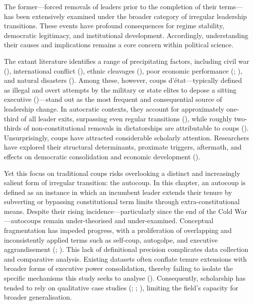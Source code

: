 \documentclass[
  12pt,
]{report}
\begin{document}
The former---forced removals of leaders prior to the completion of their
terms---has been extensively examined under the broader category of
irregular leadership transitions. These events have profound
consequences for regime stability, democratic legitimacy, and
institutional development. Accordingly, understanding their causes and
implications remains a core concern within political science.

The extant literature identifies a range of precipitating factors,
including civil war (), international conflict (), ethnic cleavages
(), poor
economic performance (;
), and natural
disasters (). Among these, however, coups d'état---typically defined as
illegal and overt attempts by the military or state elites to depose a
sitting executive ()---stand out as the most frequent and consequential source of
leadership change. In autocratic contexts, they account for
approximately one-third of all leader exits, surpassing even regular
transitions (), while
roughly two-thirds of non-constitutional removals in dictatorships are
attributable to coups ().
Unsurprisingly, coups have attracted considerable scholarly attention.
Researchers have explored their structural determinants, proximate
triggers, aftermath, and effects on democratic consolidation and
economic development ().

Yet this focus on traditional coups risks overlooking a distinct and
increasingly salient form of irregular transition: the autocoup. In this
chapter, an autocoup is defined as an instance in which an incumbent
leader extends their tenure by subverting or bypassing constitutional
term limits through extra-constitutional means. Despite their rising
incidence---particularly since the end of the Cold War---autocoups
remain under-theorised and under-examined. Conceptual fragmentation has
impeded progress, with a proliferation of overlapping and inconsistently
applied terms such as self-coup, autogolpe, and executive aggrandisement
(;
). This lack of
definitional precision complicates data collection and comparative
analysis. Existing datasets often conflate tenure extensions with
broader forms of executive power consolidation, thereby failing to
isolate the specific mechanisms this study seeks to analyse
(). Consequently,
scholarship has tended to rely on qualitative case studies
(;
;
),
limiting the field's capacity for broader generalisation.
\end{document}
